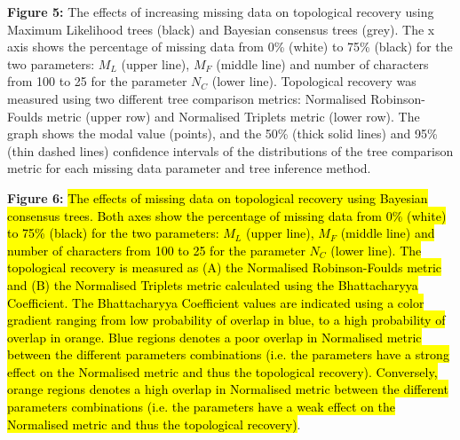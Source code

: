 \documentclass[12pt,letterpaper]{article}
\begin{document}
\bigskip
\noindent
\textbf{Figure 5:} The effects of increasing missing data on topological recovery using Maximum Likelihood trees (black) and Bayesian consensus trees (grey). The x axis shows the percentage of missing data from 0\% (white) to 75\% (black) for the two parameters: $M_{L}$ (upper line), $M_{F}$ (middle line) and number of characters from 100 to 25 for the parameter $N_{C}$ (lower line). Topological recovery was measured using two different tree comparison metrics: Normalised Robinson-Foulds metric (upper row) and Normalised Triplets metric (lower row). The graph shows the modal value (points), and the 50\% (thick solid lines) and 95\% (thin dashed lines) confidence intervals of the distributions of the tree comparison metric for each missing data parameter and tree inference method.

\bigskip
\noindent
\textbf{Figure 6:} \hl{The effects of missing data on topological recovery using Bayesian consensus trees. Both axes show the percentage of missing data from 0\% (white) to 75\% (black) for the two parameters: $M_{L}$ (upper line), $M_{F}$ (middle line) and number of characters from 100 to 25 for the parameter $N_{C}$ (lower line). The topological recovery is measured as (A) the Normalised Robinson-Foulds metric and (B) the Normalised Triplets metric calculated using the Bhattacharyya Coefficient. The Bhattacharyya Coefficient values are indicated using a color gradient ranging from low probability of overlap in blue, to a high probability of overlap in orange. Blue regions denotes a poor overlap in Normalised metric between the different parameters combinations (i.e. the parameters have a strong effect on the Normalised metric and thus the topological recovery). Conversely, orange regions denotes a high overlap in Normalised metric between the different parameters combinations (i.e. the parameters have a weak effect on the Normalised metric and thus the topological recovery)}.
\end{document}
